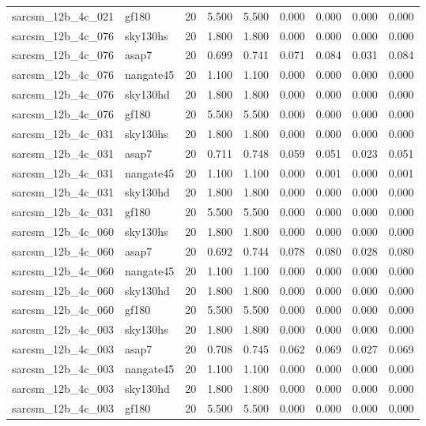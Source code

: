 \begin{tabular}{llrrrrrrr}
sarcsm\_12b\_4c\_021 & gf180 & 20 & 5.500 & 5.500 & 0.000 & 0.000 & 0.000 & 0.000 \\
sarcsm\_12b\_4c\_076 & sky130hs & 20 & 1.800 & 1.800 & 0.000 & 0.000 & 0.000 & 0.000 \\
sarcsm\_12b\_4c\_076 & asap7 & 20 & 0.699 & 0.741 & 0.071 & 0.084 & 0.031 & 0.084 \\
sarcsm\_12b\_4c\_076 & nangate45 & 20 & 1.100 & 1.100 & 0.000 & 0.000 & 0.000 & 0.000 \\
sarcsm\_12b\_4c\_076 & sky130hd & 20 & 1.800 & 1.800 & 0.000 & 0.000 & 0.000 & 0.000 \\
sarcsm\_12b\_4c\_076 & gf180 & 20 & 5.500 & 5.500 & 0.000 & 0.000 & 0.000 & 0.000 \\
sarcsm\_12b\_4c\_031 & sky130hs & 20 & 1.800 & 1.800 & 0.000 & 0.000 & 0.000 & 0.000 \\
sarcsm\_12b\_4c\_031 & asap7 & 20 & 0.711 & 0.748 & 0.059 & 0.051 & 0.023 & 0.051 \\
sarcsm\_12b\_4c\_031 & nangate45 & 20 & 1.100 & 1.100 & 0.000 & 0.001 & 0.000 & 0.001 \\
sarcsm\_12b\_4c\_031 & sky130hd & 20 & 1.800 & 1.800 & 0.000 & 0.000 & 0.000 & 0.000 \\
sarcsm\_12b\_4c\_031 & gf180 & 20 & 5.500 & 5.500 & 0.000 & 0.000 & 0.000 & 0.000 \\
sarcsm\_12b\_4c\_060 & sky130hs & 20 & 1.800 & 1.800 & 0.000 & 0.000 & 0.000 & 0.000 \\
sarcsm\_12b\_4c\_060 & asap7 & 20 & 0.692 & 0.744 & 0.078 & 0.080 & 0.028 & 0.080 \\
sarcsm\_12b\_4c\_060 & nangate45 & 20 & 1.100 & 1.100 & 0.000 & 0.000 & 0.000 & 0.000 \\
sarcsm\_12b\_4c\_060 & sky130hd & 20 & 1.800 & 1.800 & 0.000 & 0.000 & 0.000 & 0.000 \\
sarcsm\_12b\_4c\_060 & gf180 & 20 & 5.500 & 5.500 & 0.000 & 0.000 & 0.000 & 0.000 \\
sarcsm\_12b\_4c\_003 & sky130hs & 20 & 1.800 & 1.800 & 0.000 & 0.000 & 0.000 & 0.000 \\
sarcsm\_12b\_4c\_003 & asap7 & 20 & 0.708 & 0.745 & 0.062 & 0.069 & 0.027 & 0.069 \\
sarcsm\_12b\_4c\_003 & nangate45 & 20 & 1.100 & 1.100 & 0.000 & 0.000 & 0.000 & 0.000 \\
sarcsm\_12b\_4c\_003 & sky130hd & 20 & 1.800 & 1.800 & 0.000 & 0.000 & 0.000 & 0.000 \\
sarcsm\_12b\_4c\_003 & gf180 & 20 & 5.500 & 5.500 & 0.000 & 0.000 & 0.000 & 0.000 \\

\end{tabular}
